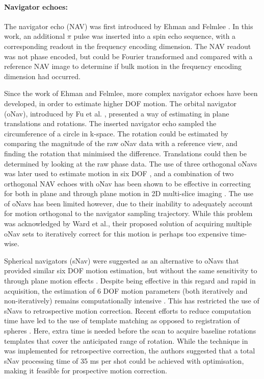 \documentclass[class=article, crop=false]{standalone}
\begin{document}
\paragraph{Navigator echoes:}
The navigator echo (NAV) was first introduced by Ehman and Felmlee \parencite*{Ehman1989}. In this work, an additional $\pi$ pulse was inserted into a spin echo sequence, with a corresponding readout in the frequency encoding dimension. The NAV readout was not phase encoded, but could be Fourier transformed and compared with a reference NAV image to determine if bulk motion in the frequency encoding dimension had occurred. 
\par
Since the work of Ehman and Felmlee, more complex navigator echoes have been developed, in order to estimate higher DOF motion. The orbital navigator (oNav), introduced by Fu et al. \parencite*{ZhuoWuFu1995}, presented a way of estimating in plane translations and rotations. The inserted navigator echo sampled the circumference of a circle in k-space. The rotation could be estimated by comparing the magnitude of the raw oNav data with a reference view, and finding the rotation that minimised the difference. Translations could then be determined by looking at the raw phase data. The use of three orthogonal oNavs was later used to estimate motion in six DOF \parencite{Ward2000}, and a combination of two orthogonal NAV echoes with oNav has been shown to be effective in correcting for both in plane and through plane motion in 2D multi-slice imaging \parencite{Lin2014}. The use of oNavs has been limited however, due to their inability to adequately account for motion orthogonal to the navigator sampling trajectory. While this problem was acknowledged by Ward et al., their proposed solution of acquiring multiple oNav sets to iteratively correct for this motion is perhaps too expensive time-wise.
\par
Spherical navigators (sNav) were suggested as an alternative to oNavs that provided similar six DOF motion estimation, but without the same sensitivity to through plane motion effects \parencite{Welch2001,Petrie2005}. Despite being effective in this regard and rapid in acquisition, the estimation of 6 DOF motion parameters (both iteratively and non-iteratively) remains computationally intensive \parencite{Welch2004,Costa2010,Costa2005}. This has restricted the use of sNavs to retrospective motion correction. Recent efforts to reduce computation time have led to the use of template matching as opposed to registration of spheres \parencite{Liu2011,Johnson2016}. Here, extra time is needed before the scan to acquire baseline rotations templates that cover the anticipated range of rotation. While the technique in \cite{Johnson2016} was implemented for retrospective correction, the authors suggested that a total sNav processing time of 35 ms per shot could be achieved with optimisation, making it feasible for prospective motion correction.
\end{document}
